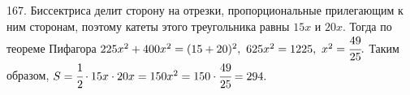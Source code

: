 167. Биссектриса делит сторону на отрезки, пропорциональные прилегающим к ним сторонам, поэтому катеты этого треугольника равны $15x$ и $20x.$ Тогда по теореме Пифагора $225x^2+400x^2=(15+20)^2,\ 625x^2=1225,\ x^2=\cfrac{49}{25}.$ Таким образом, $S=\cfrac{1}{2}\cdot15x\cdot20x=150x^2=150\cdot\cfrac{49}{25}=294.$\\
